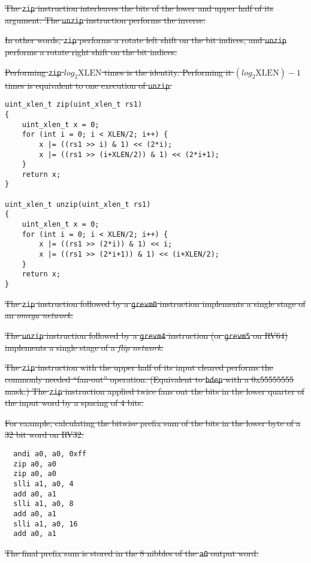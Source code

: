\sout{
The \texttt{zip} instruction interleaves the bits of the lower and upper
half of its argument. The \texttt{unzip} instruction performs the inverse.
}

\sout{
In other words, \texttt{zip} performs a rotate left shift on the bit indices,
and \texttt{unzip} performs a rotate right shift on the bit indices.
}

\sout{
Performing \texttt{zip} $log_2\textrm{XLEN}$ times is the identity. Performing it
$(log_2\textrm{XLEN})-1$ times is equivalent to one execution of \texttt{unzip}.
}

\begin{verbatim}
uint_xlen_t zip(uint_xlen_t rs1)
{
    uint_xlen_t x = 0;
    for (int i = 0; i < XLEN/2; i++) {
        x |= ((rs1 >> i) & 1) << (2*i);
        x |= ((rs1 >> (i+XLEN/2)) & 1) << (2*i+1);
    }
    return x;
}

uint_xlen_t unzip(uint_xlen_t rs1)
{
    uint_xlen_t x = 0;
    for (int i = 0; i < XLEN/2; i++) {
        x |= ((rs1 >> (2*i)) & 1) << i;
        x |= ((rs1 >> (2*i+1)) & 1) << (i+XLEN/2);
    }
    return x;
}
\end{verbatim}

\sout{
The \texttt{zip} instruction followed by a \texttt{grevm0} instruction
implements a single stage of an {\it omega network}.
}

\sout{
The \texttt{unzip} instruction followed by a \texttt{grevm4} instruction (or
\texttt{grevm5} on RV64) implements a single stage of a {\it flip network}.
}

\sout{
The \texttt{zip} instruction with the upper half of its input cleared performs
the commonly needed ``fan-out'' operation. (Equivalent to {\tt bdep} with a
0x55555555 mask.) The \texttt{zip} instruction applied twice fans out the bits
in the lower quarter of the input word by a spacing of 4 bits.
}

\sout{
For example, calculating the bitwise prefix sum of the bits in the lower byte
of a 32 bit word on RV32:
}

\begin{verbatim}
  andi a0, a0, 0xff
  zip a0, a0
  zip a0, a0
  slli a1, a0, 4
  add a0, a1
  slli a1, a0, 8
  add a0, a1
  slli a1, a0, 16
  add a0, a1
\end{verbatim}

\sout{
The final prefix sum is stored in the 8 nibbles of the {\tt a0} output word.
}
